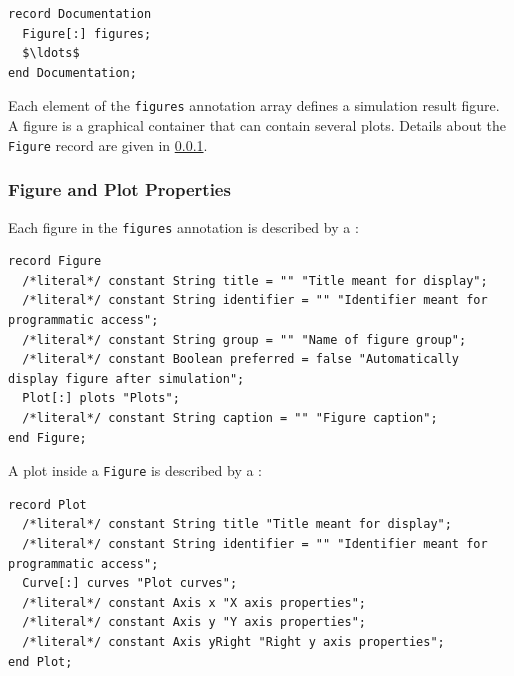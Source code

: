 \begin{annotationdefinition*}[figures]\label{modelica:Documentation.figures}
\begin{synopsis}\begin{lstlisting}
record Documentation
  Figure[:] figures;
  $\ldots$
end Documentation;
\end{lstlisting}\end{synopsis}
\begin{semantics}
Each element of the \lstinline!figures! annotation array defines a simulation result figure.
A figure is a graphical container that can contain several plots.
Details about the \lstinline!Figure! record are given in \cref{figure-plot-properties}.
\end{semantics}
\end{annotationdefinition*}

\subsubsection{Figure and Plot Properties}\label{figure-plot-properties}

Each figure in the \lstinline!figures! annotation is described by a :
\begin{lstlisting}[language=modelica]
record Figure
  /*literal*/ constant String title = "" "Title meant for display";
  /*literal*/ constant String identifier = "" "Identifier meant for programmatic access";
  /*literal*/ constant String group = "" "Name of figure group";
  /*literal*/ constant Boolean preferred = false "Automatically display figure after simulation";
  Plot[:] plots "Plots";
  /*literal*/ constant String caption = "" "Figure caption";
end Figure;
\end{lstlisting}

A plot inside a \lstinline!Figure! is described by a :
\begin{lstlisting}[language=modelica]
record Plot
  /*literal*/ constant String title "Title meant for display";
  /*literal*/ constant String identifier = "" "Identifier meant for programmatic access";
  Curve[:] curves "Plot curves";
  /*literal*/ constant Axis x "X axis properties";
  /*literal*/ constant Axis y "Y axis properties";
  /*literal*/ constant Axis yRight "Right y axis properties";
end Plot;
\end{lstlisting}

